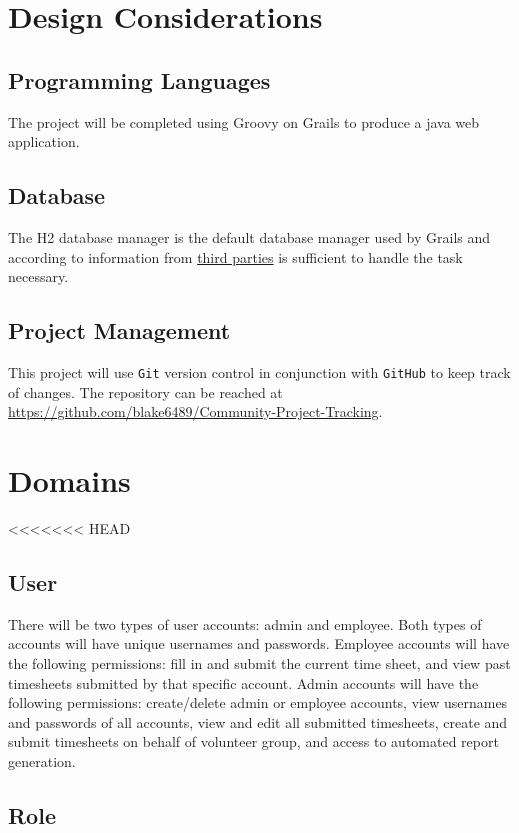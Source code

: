 \documentclass[12pt]{article}
\newcommand{\e}[1] {{\tt #1}}
\begin{document}
\section{Design Considerations}

\subsection{Programming Languages}
The project will be completed using Groovy on Grails to produce a java web application. 

\subsection{Database}
The H2 database manager is the default database manager used by Grails and according to information from \href{http://database-management-systems.findthebest.com/compare/16-30/H2-vs-MySQL}{third parties} is sufficient to handle the task necessary.

\subsection{Project Management}
This project will use \e{Git} version control in conjunction with \e{GitHub} to keep track of changes. The repository can be reached at \url{https://github.com/blake6489/Community-Project-Tracking}.

\section{Domains}\label{sec:Domains}
<<<<<<< HEAD
\subsection{User}
There will be two types of user accounts: admin and employee. Both types of accounts will have unique usernames and passwords. Employee accounts will have the following permissions: fill in and submit the current time sheet, and view past timesheets submitted by that specific account. Admin accounts will have the following permissions: create/delete admin or employee accounts, view usernames and passwords of all accounts, view and edit all submitted timesheets, create and submit timesheets on behalf of volunteer group, and access to automated report generation.
\subsection{Role}
\end{document}
